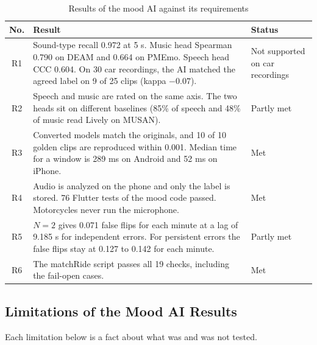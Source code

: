\begin{table}[htbp]
    \centering
    \caption{Results of the mood AI against its requirements}\label{tab:ai-summary}
    \small
    \renewcommand{\arraystretch}{1.2}
    \begin{tabular}{|c|>{\raggedright\arraybackslash}p{}|>{\raggedright\arraybackslash}p{}|}
        \hline
        \textbf{No.} & \textbf{Result} & \textbf{Status} \\
        \hline
        R1 & Sound-type recall 0.972 at 5 s. Music head Spearman 0.790 on DEAM and 0.664 on PMEmo. Speech head CCC 0.604. On 30 car recordings, the AI matched the agreed label on 9 of 25 clips (kappa $-0.07$). & Not supported on car recordings \\
        \hline
        R2 & Speech and music are rated on the same axis. The two heads sit on different baselines (85\% of speech and 48\% of music read Lively on MUSAN). & Partly met \\
        \hline
        R3 & Converted models match the originals, and 10 of 10 golden clips are reproduced within 0.001. Median time for a window is 289 ms on Android and 52 ms on iPhone. & Met \\
        \hline
        R4 & Audio is analyzed on the phone and only the label is stored. 76 Flutter tests of the mood code passed. Motorcycles never run the microphone. & Met \\
        \hline
        R5 & $N=2$ gives 0.071 false flips for each minute at a lag of 9.185 s for independent errors. For persistent errors the false flips stay at 0.127 to 0.142 for each minute. & Partly met \\
        \hline
        R6 & The matchRide script passes all 19 checks, including the fail-open cases. & Met \\
        \hline
    \end{tabular}
\end{table}

\subsection{Limitations of the Mood AI Results}
\label{sec:ai-limits}
Each limitation below is a fact about what was and was not tested.

